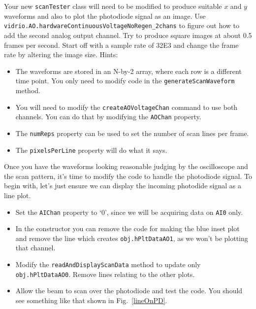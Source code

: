 \documentclass[a4paper]{report}
\begin{document}
\noindent
Your new \texttt{scanTester} class will need to be modified to produce suitable $x$ and $y$ waveforms and also to plot the photodiode signal as an image. 
Use \texttt{vidrio.AO.hardwareContinuousVoltageNoRegen\_2chans} to figure out how to add the second analog output channel.
Try to produce square images at about 0.5 frames per second. 
Start off with a sample rate of 32E3 and change the frame rate by altering the image size.
Hints:
\begin{itemize}
    \setlength\itemsep{0.15em}
    \item The waveforms are stored in an N-by-2 array, where each row is a different time point. You only need to modify code in the \texttt{generateScanWaveform} method.
    \item You will need to modify the \texttt{createAOVoltageChan} command to use both channels. You can do that by modifying the \texttt{AOChan} property.
    \item The \texttt{numReps} property can be used to set the number of scan lines per frame.
    \item The \texttt{pixelsPerLine} property will do what it says. 
\end{itemize}

\noindent

Once you have the waveforms looking reasonable judging by the oscilloscope and the scan pattern, it's time to modify the code to handle the photodiode signal. 
To begin with, let's just ensure we can display the incoming photodide signal as a line plot.

\begin{itemize}
    \setlength\itemsep{0.15em}
    \item Set the \texttt{AIChan} property to `0', since we will be acquiring data on \texttt{AI0} only.
    \item In the constructor you can remove the code for making the blue inset plot and remove the line which creates \texttt{obj.hPltDataAO1}, as we won't be plotting that channel.
    \item Modify the \texttt{readAndDisplayScanData} method to update only \texttt{obj.hPltDataAO0}. Remove lines relating to the other plots. 
    \item Allow the beam to scan over the photodiode and test the code. 
    You should see something like that shown in Fig.~\ref{lineOnPD}. 
\end{itemize}

\noindent
\end{document}
